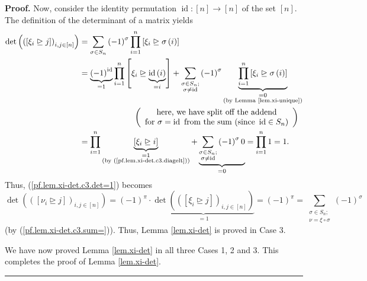 \documentclass[numbers=enddot,12pt,final,onecolumn,notitlepage,english]{scrartcl}%
\theoremstyle{definition}
\newenvironment{proof}[1][Proof]{\noindent\textbf{#1.} }{\ \rule{0.5em}{0.5em}}
\let\sumnonlimits\sum
\let\prodnonlimits\prod
\renewcommand{\sum}{\sumnonlimits\limits}
\renewcommand{\prod}{\prodnonlimits\limits}
\newenvironment{verlong}{}{}
\begin{document}
\begin{proof}
\begin{verlong}
Now, consider the identity permutation $\operatorname*{id}:\left[  n\right]
\rightarrow\left[  n\right]  $ of the set $\left[  n\right]  $. The definition
of the determinant of a matrix yields%
\begin{align*}
\det\left(  \left(  \left[  \xi_{i}\trianglerighteq j\right]  \right)
_{i,j\in\left[  n\right]  }\right)   &  =\sum_{\sigma\in S_{n}}\left(
-1\right)  ^{\sigma}\prod_{i=1}^{n}\left[  \xi_{i}\trianglerighteq
\sigma\left(  i\right)  \right] \\
&  =\underbrace{\left(  -1\right)  ^{\operatorname*{id}}}_{=1}\prod_{i=1}%
^{n}\left[  \xi_{i}\trianglerighteq\underbrace{\operatorname*{id}\left(
i\right)  }_{=i}\right]  +\sum_{\substack{\sigma\in S_{n};\\\sigma
\neq\operatorname*{id}}}\left(  -1\right)  ^{\sigma}\underbrace{\prod
_{i=1}^{n}\left[  \xi_{i}\trianglerighteq\sigma\left(  i\right)  \right]
}_{\substack{=0\\\text{(by Lemma \ref{lem.xi-unique})}}}\\
&  \ \ \ \ \ \ \ \ \ \ \ \ \ \ \ \ \ \ \ \ \left(
\begin{array}
[c]{c}%
\text{here, we have split off the addend}\\
\text{for }\sigma=\operatorname*{id}\text{ from the sum (since }%
\operatorname*{id}\in S_{n}\text{)}%
\end{array}
\right) \\
&  =\prod_{i=1}^{n}\underbrace{\left[  \xi_{i}\trianglerighteq i\right]
}_{\substack{=1\\\text{(by (\ref{pf.lem.xi-det.c3.diagelt}))}}%
}+\underbrace{\sum_{\substack{\sigma\in S_{n};\\\sigma\neq\operatorname*{id}%
}}\left(  -1\right)  ^{\sigma}0}_{=0}=\prod_{i=1}^{n}1=1.
\end{align*}
Thus, (\ref{pf.lem.xi-det.c3.det=1}) becomes%
\[
\det\left(  \left(  \left[  \nu_{i}\trianglerighteq j\right]  \right)
_{i,j\in\left[  n\right]  }\right)  =\left(  -1\right)  ^{\pi}\cdot
\underbrace{\det\left(  \left(  \left[  \xi_{i}\trianglerighteq j\right]
\right)  _{i,j\in\left[  n\right]  }\right)  }_{=1}=\left(  -1\right)  ^{\pi
}=\sum_{\substack{\sigma\in S_{n};\\\nu=\xi\circ\sigma}}\left(  -1\right)
^{\sigma}%
\]
(by (\ref{pf.lem.xi-det.c3.sum=})). Thus, Lemma \ref{lem.xi-det} is proved in
Case 3. \medskip
\end{verlong}

We have now proved Lemma \ref{lem.xi-det} in all three Cases 1, 2 and 3. This
completes the proof of Lemma \ref{lem.xi-det}.
\end{proof}
\end{document}
